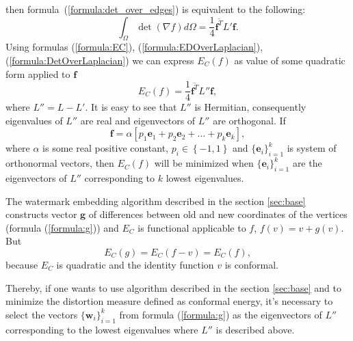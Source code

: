 \documentclass{article}
\newcommand{\conjugate}{\overline}
\begin{document}
then formula~(\ref{formula:det_over_edges}) is equivalent to the following:
\begin{equation}
\label{formula:DetOverLaplacian}
  \int_{\Omega} \det {\left( \nabla f \right) } d\Omega = \frac{1}{4} \conjugate{\mathbf{f}^T} L' \mathbf{f}.
\end{equation}
Using formulas (\ref{formula:EC}), (\ref{formula:EDOverLaplacian}), (\ref{formula:DetOverLaplacian}) we can express $E_C(f)$ as value of some quadratic form 
applied to $\mathbf{f}$
\begin{equation*}
  E_C(f) = \frac{1}{4}\conjugate{\mathbf{f}^T} L'' \mathbf{f},
\end{equation*}
where $L'' = L - L'$. It is easy to see that $L''$ is Hermitian, consequently eigenvalues of $L''$ are real and eigenvectors of $L''$ are orthogonal.
If $$\mathbf{f} = \alpha \left[ p_1 \mathbf{e}_1 + p_2 \mathbf{e}_2 + \dots + p_k \mathbf{e}_k \right],$$ 
where $\alpha$ is some real positive constant, $p_i \in \left\{-1, 1 \right\}$ and $\{\mathbf{e}_i\}_{i=1}^k$ is system of orthonormal vectors, 
then $E_C(f)$ will be minimized when $\{\mathbf{e}_i\}_{i=1}^k$ are the eigenvectors of $L''$ corresponding to $k$ lowest eigenvalues. 

The watermark embedding algorithm described in the section \ref{sec:base} constructs vector $\mathbf{g}$ of differences between old and new coordinates 
of the vertices (formula (\ref{formula:g})) and $E_C$ is functional applicable to $f$, $f(v) = v + g(v)$. 
But $$E_C(g) = E_C(f - v) = E_C(f),$$ because $E_C$ is quadratic and the identity function $v$ is conformal. 

Thereby, if one wants to use algorithm described in the section \ref{sec:base} and to minimize the distortion measure defined as conformal energy, 
it's necessary to select the vectors $\{\mathbf{w}_i\}_{i=1}^k$  from formula (\ref{formula:g}) as the eigenvectors of $L''$ 
corresponding to the lowest eigenvalues where $L''$ is described above.
\end{document}

